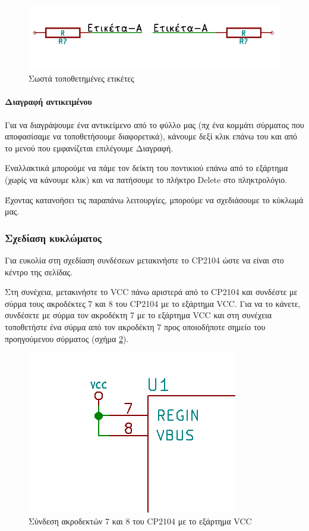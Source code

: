 \documentclass[a4paper]{article}
\begin{document}
\begin{figure}
  \begin{center}
    \includegraphics[width=.35\textwidth]{img/eesch-circ-lblok.png}
    \caption{Σωστά τοποθετημένες ετικέτες}
    \label{fig:eesch-circ-lblok}
  \end{center}
\end{figure}

\paragraph{Διαγραφή αντικειμένου}
Για να διαγράψουμε ένα αντικείμενο από το φύλλο μας (πχ ένα κομμάτι σύρματος που αποφασίσαμε να τοποθετήσουμε διαφορετικά), κάνουμε δεξί κλικ επάνω του και από το μενού που εμφανίζεται επιλέγουμε Διαγραφή.

Εναλλακτικά μπορούμε να πάμε τον δείκτη του ποντικιού επάνω από το εξάρτημα (χωρίς να κάνουμε κλικ) και να πατήσουμε το πλήκτρο Delete στο πληκτρολόγιο.

Έχοντας κατανοήσει τις παραπάνω λειτουργίες, μπορούμε να σχεδιάσουμε το κύκλωμά μας.

\subsubsection{Σχεδίαση κυκλώματος}

Για ευκολία στη σχεδίαση συνδέσεων μετακινήστε το CP2104 ώστε να είναι στο κέντρο της σελίδας.

Στη συνέχεια, μετακινήστε το VCC πάνω αριστερά από το CP2104 και συνδέστε με σύρμα τους ακροδέκτες 7 και 8 του CP2104 με το εξάρτημα VCC. Για να το κάνετε, συνδέσετε με σύρμα τον ακροδέκτη 7 με το εξάρτημα VCC και στη συνέχεια τοποθετήστε ένα σύρμα από τον  ακροδέκτη 7 προς οποιοδήποτε σημείο του προηγούμενου σύρματος (σχήμα \ref{fig:eesch-circ-78vcc}).

\begin{figure}
  \begin{center}
    \includegraphics[width=.35\textwidth]{img/eesch-circ-78vcc.png}
    \caption{Σύνδεση ακροδεκτών 7 και 8 του CP2104 με το εξάρτημα VCC}
    \label{fig:eesch-circ-78vcc}
  \end{center}
\end{figure}
\end{document}
